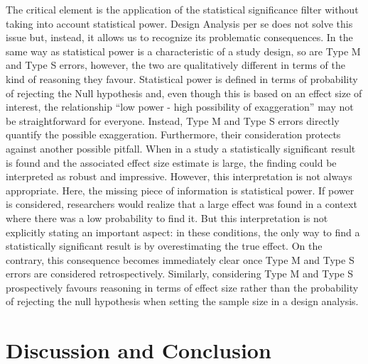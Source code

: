 \documentclass{article}\usepackage[]{graphicx}\usepackage[]{color}
\begin{document}
The critical element is the application of the statistical significance filter without taking into account statistical power. Design Analysis per se does not solve this issue but, instead, it allows us to recognize its problematic consequences. In the same way as statistical power is a characteristic of a study design, so are Type M and Type S errors, however, the two are qualitatively different in terms of the kind of reasoning they favour. Statistical power is defined in terms of probability of rejecting the Null hypothesis and, even though this is based on an effect size of interest, the relationship “low power - high possibility of exaggeration” may not be straightforward for everyone. Instead, Type M and Type S errors directly quantify the possible exaggeration. Furthermore, their consideration protects against another possible pitfall. When in a study a statistically significant result is found and the associated effect size estimate is large, the finding could be interpreted as robust and impressive. However, this interpretation is not always appropriate. Here, the missing piece of information is  statistical power. If power is considered, researchers would realize that a large effect was found in a context where there was a low probability to find it. But this interpretation is not explicitly stating an important aspect: in these conditions, the only way to find a statistically significant result is by overestimating the true effect. On the contrary, this consequence becomes immediately clear once Type M and Type S errors are considered retrospectively. Similarly, considering Type M and Type S prospectively favours reasoning in terms of effect size rather than the probability of rejecting the null hypothesis when setting the sample size in a design analysis.



\section{Discussion and Conclusion}
\end{document}
